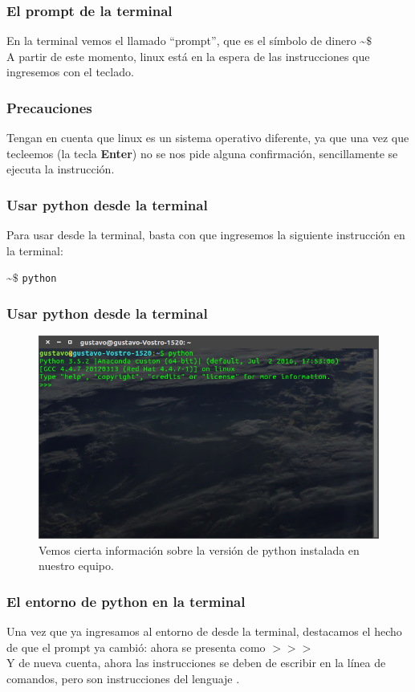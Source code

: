 \documentclass[12pt]{beamer}
\begin{document}
\begin{frame}
\frametitle{El prompt de la terminal}
En la terminal vemos el llamado \enquote{prompt}, que es el símbolo de dinero  \textasciitilde $\$$
\\
\bigskip
A partir de este momento, linux está en la espera de las instrucciones que ingresemos con el teclado.
\end{frame}
\begin{frame}
\frametitle{Precauciones}
Tengan en cuenta que linux es un sistema operativo diferente, ya que una vez que tecleemos \keys{\return} (la tecla \textbf{Enter}) no se nos pide alguna confirmación, sencillamente se ejecuta la instrucción.
\end{frame}
\begin{frame}
\frametitle{Usar python desde la terminal}
Para usar \python{} desde la terminal, basta con que ingresemos la siguiente instrucción en la terminal:
\begin{center}
\textasciitilde $\$$ \texttt{python} \keys{\return}
\end{center}
\end{frame}
\begin{frame}
\frametitle{Usar python desde la terminal}
\begin{figure}
	\centering
	\includegraphics[scale=0.25]{Figuras/Terminal_02.png}
	\caption{Vemos cierta información sobre la versión de python instalada en nuestro equipo.}
\end{figure}
\end{frame}
\begin{frame}
\frametitle{El entorno de python en la terminal}
Una vez que ya ingresamos al entorno de \python{} desde la terminal, destacamos el hecho de que el prompt ya cambió: ahora se presenta como $>>>$
\\
\bigskip
Y de nueva cuenta, ahora las instrucciones se deben de escribir en la línea de comandos, pero son instrucciones del lenguaje \python.	
\end{frame}
\end{document}
